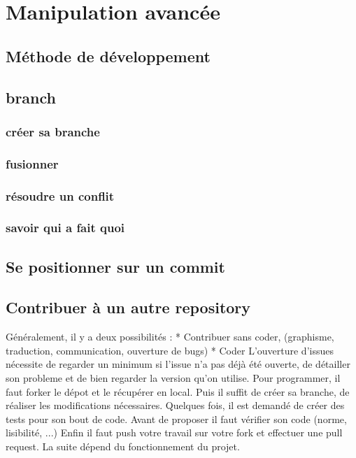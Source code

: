 \documentclass[a4paper,10pt]{report}
\begin{document}
\chapter{Manipulation avancée}
  \section{Méthode de développement}
  \section{branch}
     \subsection{créer sa branche}
     \subsection{fusionner}
     \subsection{résoudre un conflit}
     \subsection{savoir qui a fait quoi}
  \section{Se positionner sur un commit}
  \section{Contribuer à un autre repository}
Généralement, il y a deux possibilités : 
* Contribuer sans coder, (graphisme, traduction, communication, ouverture de bugs)
* Coder
L'ouverture d'issues nécessite de regarder un minimum si l'issue n'a pas déjà été ouverte, de détailler son probleme et de bien regarder la version qu'on utilise.
Pour programmer, il faut forker le dépot et le récupérer en local.
Puis il suffit de créer sa branche, de réaliser les modifications nécessaires.
Quelques fois, il est demandé de créer des tests pour son bout de code.
Avant de proposer il faut vérifier son code (norme, lisibilité, ...)
Enfin il faut push votre travail sur votre fork et effectuer une pull request.
La suite dépend du fonctionnement du projet.
\end{document}
